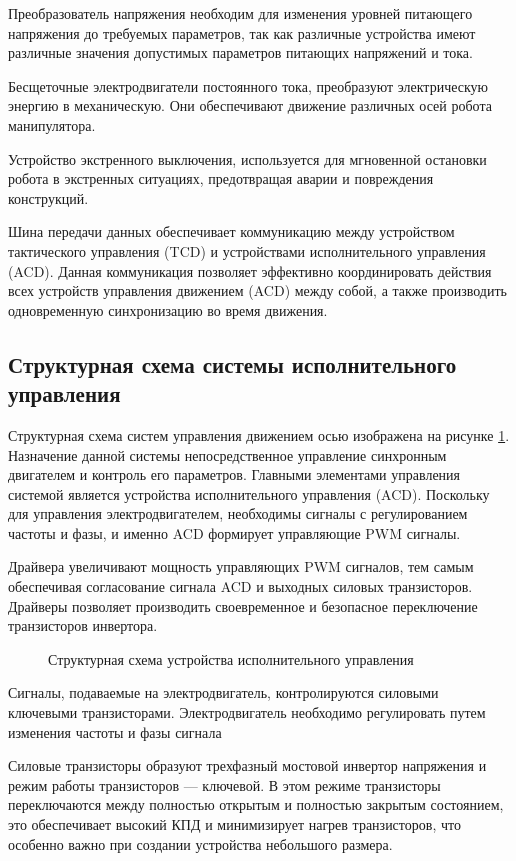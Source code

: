 Преобразователь напряжения необходим для изменения уровней питающего напряжения до требуемых параметров, так как различные устройства имеют различные значения допустимых параметров питающих напряжений и тока.

Бесщеточные электродвигатели постоянного тока, преобразуют электрическую энергию в механическую. Они обеспечивают движение различных осей робота манипулятора.

Устройство экстренного выключения, используется для мгновенной остановки робота в экстренных ситуациях, предотвращая аварии и повреждения конструкций.

Шина передачи данных обеспечивает коммуникацию между устройством тактического управления (TCD) и устройствами исполнительного управления (ACD). Данная коммуникация позволяет эффективно координировать действия всех устройств управления движением (ACD) между собой, а также производить одновременную синхронизацию во время движения.

\subsection{Структурная схема системы исполнительного управления}

Структурная схема систем управления движением осью изображена на рисунке \ref{ACD}. Назначение данной системы непосредственное управление синхронным двигателем и контроль его параметров. Главными элементами управления системой является устройства исполнительного управления (ACD). Поскольку для управления электродвигателем, необходимы сигналы с регулированием частоты и фазы, и именно   ACD формирует управляющие PWM сигналы.

Драйвера увеличивают мощность управляющих PWM сигналов, тем самым обеспечивая согласование сигнала ACD и выходных силовых транзисторов. Драйверы позволяет производить своевременное и безопасное переключение транзисторов инвертора. 

\begin{figure}[H]
	\centering
	
	\caption{Структурная схема устройства исполнительного управления}
	\label{ACD}
\end{figure}



Сигналы, подаваемые на электродвигатель, контролируются силовыми ключевыми транзисторами. Электродвигатель необходимо регулировать путем изменения частоты и фазы сигнала

Силовые транзисторы образуют трехфазный мостовой инвертор напряжения и режим работы транзисторов — ключевой. В этом режиме транзисторы переключаются между полностью открытым и полностью закрытым состоянием, это обеспечивает высокий КПД и минимизирует нагрев транзисторов, что особенно важно при создании устройства небольшого размера.

